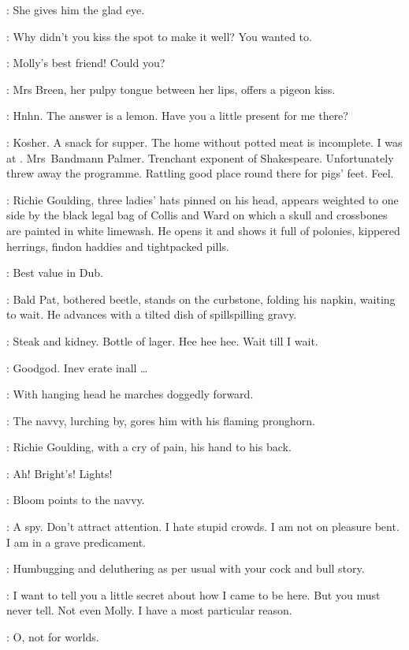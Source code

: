 :
She gives him the glad eye.

\MrsBreen:
Why didn't you kiss the spot to make it well?
You wanted to.

\Bloom:
Molly's best friend! Could you?

:
Mrs Breen, her pulpy tongue between her lips, offers a pigeon kiss.

\MrsBreen:
Hnhn.
The answer is a lemon.
Have you a little present for me there?

\Bloom:
Kosher.
A snack for supper.
The home without potted meat is incomplete.
I was at .
Mrs~Bandmann Palmer.
Trenchant exponent of Shakespeare.
Unfortunately threw away the programme.
Rattling good place round there for pigs' feet.
Feel.

:
Richie Goulding, three ladies' hats pinned on his head,
appears weighted to one side by the black legal bag of
Collis and Ward on which a skull and crossbones are painted in white limewash.
He opens it and shows it full of polonies,
kippered herrings, findon haddies and tightpacked pills.

\Richie:
Best value in Dub.

:
Bald Pat, bothered beetle, stands on the curbstone,
folding his napkin, waiting to wait.
He advances with a tilted dish of spillspilling gravy.

\Pat:
Steak and kidney.
Bottle of lager.
Hee hee hee.
Wait till I wait.

\Richie[2]:
Goodgod.
Inev erate inall \ldots

:
With hanging head he marches doggedly forward.

:
The navvy, lurching by, gores him with his flaming pronghorn.

:
Richie Goulding, with a cry of pain, his hand to his back.

\Richie:
Ah! Bright's! Lights!

:
Bloom points to the navvy.

\Bloom:
A spy.
Don't attract attention.
I hate stupid crowds.
I am not on pleasure bent.
I am in a grave predicament.

\MrsBreen:
Humbugging and deluthering as per usual with your cock and bull story.

\Bloom:
I want to tell you a little secret about how I came to be here.
But you must never tell.
Not even Molly.
I have a most particular reason.

\MrsBreen:
O, not for worlds.

